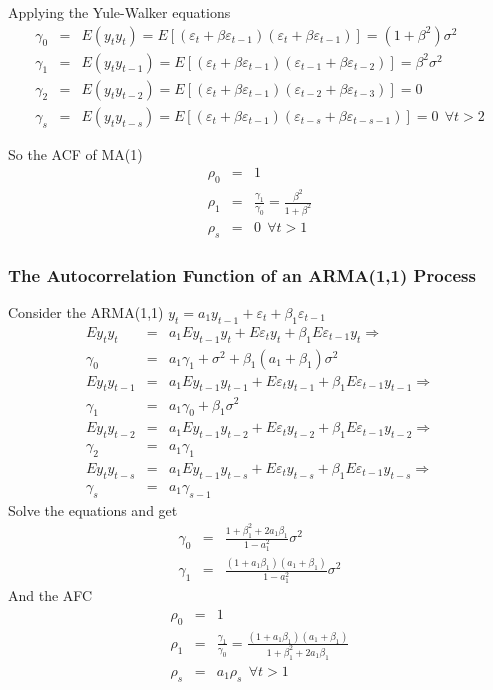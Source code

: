 Applying the Yule-Walker equations 
\begin{eqnarray*}
\gamma_{0}&=&E(y_{t}y_{t})=E\left[ (\varepsilon_{t}+\beta\varepsilon_{t-1})(\varepsilon_{t}+\beta\varepsilon_{t-1})\right]=(1+\beta^{2})\sigma^{2}\\
\gamma_{1}&=&E(y_{t}y_{t-1})=E\left[ (\varepsilon_{t}+\beta\varepsilon_{t-1})(\varepsilon_{t-1}+\beta\varepsilon_{t-2})\right]=\beta^{2}\sigma^{2}\\
\gamma_{2}&=&E(y_{t}y_{t-2})=E\left[ (\varepsilon_{t}+\beta\varepsilon_{t-1})(\varepsilon_{t-2}+\beta\varepsilon_{t-3})\right]=0\\
\gamma_{s}&=&E(y_{t}y_{t-s})=E\left[ (\varepsilon_{t}+\beta\varepsilon_{t-1})(\varepsilon_{t-s}+\beta\varepsilon_{t-s-1})\right]=0 \ \ \forall t>2
\end{eqnarray*}

So the ACF of MA(1)
\begin{eqnarray*}
\rho_{0}&=&1\\
\rho_{1}&=&\frac{\gamma_{1}}{\gamma_{0}}=\frac{\beta^{2}}{1+\beta^{2}}\\
\rho_{s}&=&0 \ \ \forall t>1
\end{eqnarray*}

\subsubsection{The Autocorrelation Function of an ARMA(1,1) Process}
Consider the ARMA(1,1) $y_{t}=a_{1}y_{t-1}+\varepsilon_{t}+\beta_{1}\varepsilon_{t-1}$
\begin{eqnarray*}
Ey_{t}y_{t}&=&a_{1}Ey_{t-1}y_{t}+E\varepsilon_{t}y_{t}+\beta_{1}E\varepsilon_{t-1}y_{t} \Rightarrow \\
\gamma_{0}&=&a_{1}\gamma_{1}+\sigma^{2}+\beta_{1}(a_{1}+\beta_{1})\sigma^{2}\\
Ey_{t}y_{t-1}&=&a_{1}Ey_{t-1}y_{t-1}+E\varepsilon_{t}y_{t-1}+\beta_{1}E\varepsilon_{t-1}y_{t-1} \Rightarrow \\
\gamma_{1}&=&a_{1}\gamma_{0}+\beta_{1}\sigma^{2}\\
Ey_{t}y_{t-2}&=&a_{1}Ey_{t-1}y_{t-2}+E\varepsilon_{t}y_{t-2}+\beta_{1}E\varepsilon_{t-1}y_{t-2} \Rightarrow \\
\gamma_{2}&=&a_{1}\gamma_{1}\\
Ey_{t}y_{t-s}&=&a_{1}Ey_{t-1}y_{t-s}+E\varepsilon_{t}y_{t-s}+\beta_{1}E\varepsilon_{t-1}y_{t-s} \Rightarrow \\
\gamma_{s}&=&a_{1}\gamma_{s-1}
\end{eqnarray*}
Solve the equations and get 
\begin{eqnarray*}
\gamma_{0}&=&\frac{1+\beta_{1}^{2}+2a_{1}\beta_{1}}{1-a_{1}^{2}}\sigma^{2}\\
\gamma_{1}&=&\frac{(1+a_{1}\beta_{1})(a_{1}+\beta_{1})}{1-a_{1}^{2}}\sigma^{2}
\end{eqnarray*}
And the AFC 
\begin{eqnarray*}
\rho_{0}&=&1\\
\rho_{1}&=&\frac{\gamma_{1}}{\gamma_{0}}=\frac{(1+a_{1}\beta_{1})(a_{1}+\beta_{1})}{1+\beta_{1}^{2}+2a_{1}\beta_{1}}\\
\rho_{s}&=&a_{1}\rho_{s} \ \ \forall t>1
\end{eqnarray*}

